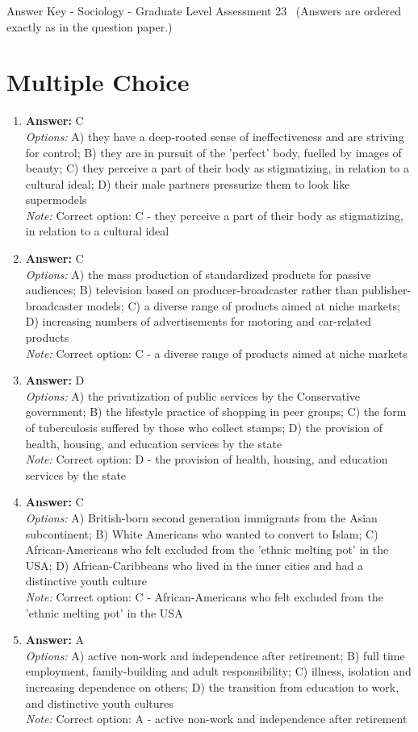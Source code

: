 \documentclass[12pt]{article}
\begin{document}
\begin{center}
Answer Key - Sociology - Graduate Level Assessment 23 \
\small (Answers are ordered exactly as in the question paper.)
\end{center}

\section*{Multiple Choice}
\begin{enumerate}[label=\arabic*.]
\item \textbf{Answer:} C
\\ \textit{Options:} A) they have a deep-rooted sense of ineffectiveness and are striving for control; B) they are in pursuit of the 'perfect' body, fuelled by images of beauty; C) they perceive a part of their body as stigmatizing, in relation to a cultural ideal; D) their male partners pressurize them to look like supermodels
\\ \textit{Note:} Correct option: C - they perceive a part of their body as stigmatizing, in relation to a cultural ideal
\item \textbf{Answer:} C
\\ \textit{Options:} A) the mass production of standardized products for passive audiences; B) television based on producer-broadcaster rather than publisher-broadcaster models; C) a diverse range of products aimed at niche markets; D) increasing numbers of advertisements for motoring and car-related products
\\ \textit{Note:} Correct option: C - a diverse range of products aimed at niche markets
\item \textbf{Answer:} D
\\ \textit{Options:} A) the privatization of public services by the Conservative government; B) the lifestyle practice of shopping in peer groups; C) the form of tuberculosis suffered by those who collect stamps; D) the provision of health, housing, and education services by the state
\\ \textit{Note:} Correct option: D - the provision of health, housing, and education services by the state
\item \textbf{Answer:} C
\\ \textit{Options:} A) British-born second generation immigrants from the Asian subcontinent; B) White Americans who wanted to convert to Islam; C) African-Americans who felt excluded from the 'ethnic melting pot' in the USA; D) African-Caribbeans who lived in the inner cities and had a distinctive youth culture
\\ \textit{Note:} Correct option: C - African-Americans who felt excluded from the 'ethnic melting pot' in the USA
\item \textbf{Answer:} A
\\ \textit{Options:} A) active non-work and independence after retirement; B) full time employment, family-building and adult responsibility; C) illness, isolation and increasing dependence on others; D) the transition from education to work, and distinctive youth cultures
\\ \textit{Note:} Correct option: A - active non-work and independence after retirement
\end{enumerate}
\end{document}
